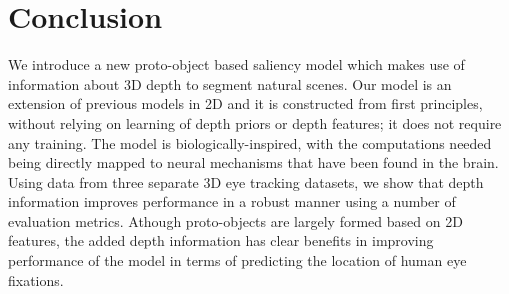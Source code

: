 \section*{Conclusion}
We introduce a new proto-object based saliency model which makes use
of information about 3D depth to segment natural scenes.  Our model is an extension of previous models in 2D and it is constructed from first principles, without relying on learning of depth priors or depth features; it does not require any training. The model is biologically-inspired, with the computations needed being directly
mapped to neural mechanisms that have been found in the brain. Using data from three separate 3D eye tracking datasets, we show that depth information improves performance in a robust manner using a number of evaluation metrics. Athough proto-objects are largely formed based on 2D features, the added depth information has clear benefits in improving performance of the model in terms of predicting the location of human eye fixations.
